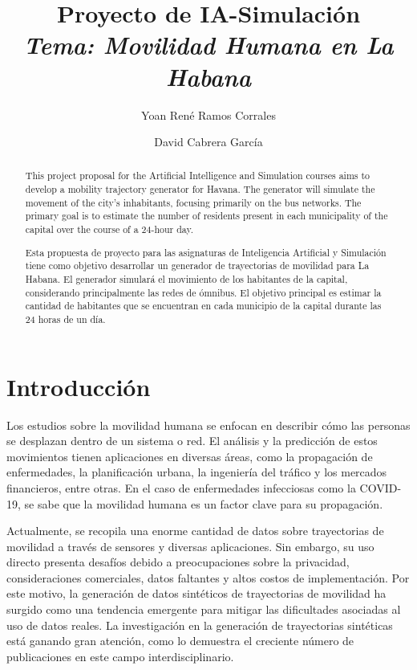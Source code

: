 \documentclass[a4paper,12pt]{article}
\title{Proyecto de IA-Simulaci\'on\\\textit{Tema: Movilidad Humana en La Habana}}
\author{Yoan Ren\'e Ramos Corrales \newline \and David Cabrera Garc\'ia}
\begin{document}
\maketitle

\renewcommand{\abstractname}{Abstract}
\begin{abstract}
This project proposal for the Artificial Intelligence and Simulation courses aims to develop a mobility trajectory generator for Havana. The generator will simulate the movement of the city's inhabitants, focusing primarily on the bus networks. The primary goal is to estimate the number of residents present in each municipality of the capital over the course of a 24-hour day.
\end{abstract}
\renewcommand{\abstractname}{Resumen}
\begin{abstract}
Esta propuesta de proyecto para las asignaturas de Inteligencia Artificial y Simulación tiene como objetivo desarrollar un generador de trayectorias de movilidad para La Habana. El generador simulará el movimiento de los habitantes de la capital, considerando principalmente las redes de ómnibus. El objetivo principal es estimar la cantidad de habitantes que se encuentran en cada municipio de la capital durante las 24 horas de un día.
\end{abstract}


\tableofcontents
\newpage

\section{Introducción}
Los estudios sobre la movilidad humana se enfocan en describir cómo las personas se desplazan dentro de un sistema o red. El análisis y la predicción de estos movimientos tienen aplicaciones en diversas áreas, como la propagación de enfermedades, la planificación urbana, la ingeniería del tráfico y los mercados financieros, entre otras. En el caso de enfermedades infecciosas como la COVID-19, se sabe que la movilidad humana es un factor clave para su propagación.

Actualmente, se recopila una enorme cantidad de datos sobre trayectorias de movilidad a través de sensores y diversas aplicaciones. Sin embargo, su uso directo presenta desafíos debido a preocupaciones sobre la privacidad, consideraciones comerciales, datos faltantes y altos costos de implementación. Por este motivo, la generación de datos sintéticos de trayectorias de movilidad ha surgido como una tendencia emergente para mitigar las dificultades asociadas al uso de datos reales. La investigación en la generación de trayectorias sintéticas está ganando gran atención, como lo demuestra el creciente número de publicaciones en este campo interdisciplinario.
\end{document}
